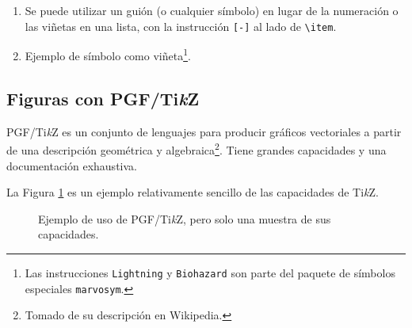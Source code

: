 \documentclass[12pt,letterpaper]{article}
\newcommand{\EIE}{\textsc{Escuela \Lightning~ Ingeniería Eléctrica}}
\begin{document}
\begin{enumerate}
\verb+\newcommand{\EIE}{\textsc{Escuela \Lightning~ Ingeniería Eléctrica}}+ 

y así se crea el comando \verb+\EIE+ que genera: \EIE.
\item[--] Se puede utilizar un guión (o cualquier símbolo) en lugar de la numeración o las viñetas en una lista, con la instrucción \verb+[-]+ al lado de \verb+\item+.
\item[\Biohazard] Ejemplo de símbolo como viñeta\footnote{Las instrucciones \texttt{Lightning} y \texttt{Biohazard} son parte del paquete de símbolos especiales \texttt{marvosym}.}.
\end{enumerate}

\subsection{Figuras con PGF/Ti\textit{k}Z}

PGF/Ti\textit{k}Z es un conjunto de lenguajes para producir gráficos vectoriales a partir de una descripción geométrica y algebraica\footnote{Tomado de su descripción en Wikipedia.}. Tiene grandes capacidades y una documentación exhaustiva.

La Figura \ref{F:tikz} es un ejemplo relativamente sencillo de las capacidades de Ti\textit{k}Z.

\begin{figure}[H]
\centering
\caption[Ejemplo de uso de PGF/Ti\textit{k}Z]{Ejemplo de uso de PGF/Ti\textit{k}Z, pero solo una muestra de sus capacidades.}
\label{F:tikz}
\end{figure}
\end{document}
